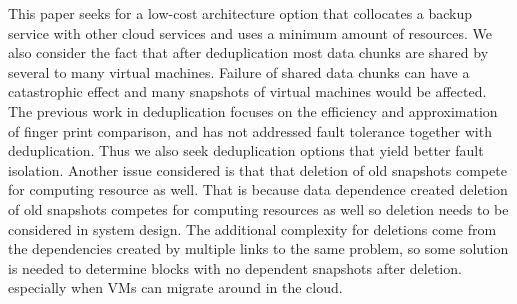 This paper seeks for a low-cost architecture option  that collocates
a backup service with other cloud services and  uses a minimum amount of resources. 
We also consider the fact that after
deduplication most data chunks are shared by several to many virtual machines.
Failure of shared data chunks can have a catastrophic effect and many
snapshots of virtual machines would be affected.
The previous work in deduplication focuses on the efficiency and approximation of
finger print comparison, and has not addressed fault tolerance together with deduplication.
Thus we also seek deduplication options that yield better fault isolation.
Another issue considered is that
that deletion of old snapshots compete for computing resource as well. That is because data dependence created
deletion of old snapshots competes for computing resources as well so deletion needs
to be considered in system design. The additional complexity for deletions
come from the dependencies created by multiple links to the same problem, so
some solution is needed to determine blocks with no dependent snapshots after deletion.
especially when  VMs can migrate around in the cloud.


